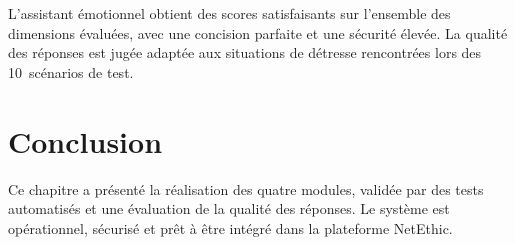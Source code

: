 L'assistant émotionnel obtient des scores satisfaisants sur l'ensemble des dimensions évaluées,
avec une concision parfaite et une sécurité élevée. La qualité des réponses est jugée
adaptée aux situations de détresse rencontrées lors des 10~scénarios de test.

\section*{Conclusion}

Ce chapitre a présenté la réalisation des quatre modules, validée par des tests automatisés
et une évaluation de la qualité des réponses. Le système est opérationnel, sécurisé
et prêt à être intégré dans la plateforme NetEthic.
